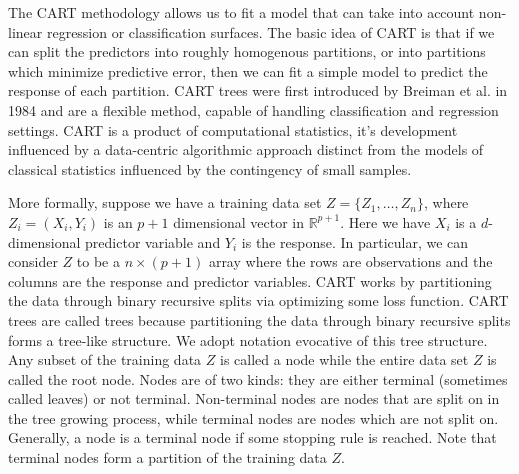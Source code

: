 \documentclass[12pt,twoside]{reedthesis}
\theoremstyle{definition}
\theoremstyle{definition}
\theoremstyle{definition}
\theoremstyle{remark}
\begin{document}
The CART methodology allows us to fit a model that can take into account
non-linear regression or classification surfaces. The basic idea of CART
is that if we can split the predictors into roughly homogenous
partitions, or into partitions which minimize predictive error, then we
can fit a simple model to predict the response of each partition. CART
trees were first introduced by Breiman et al. in 1984 and are a flexible
method, capable of handling classification and regression settings. CART
is a product of computational statistics, it's development influenced by
a data-centric algorithmic approach distinct from the models of
classical statistics influenced by the contingency of small samples.

More formally, suppose we have a training data set
\(Z=\{Z_1,\ldots,Z_n\}\), where \(Z_i=(X_i,Y_i)\) is an \(p+1\)
dimensional vector in \(\mathbb{R}^{p+1}\). Here we have \(X_i\) is a
\(d\)-dimensional predictor variable and \(Y_i\) is the response. In
particular, we can consider \(Z\) to be a \(n\times (p+1)\) array where
the rows are observations and the columns are the response and predictor
variables. CART works by partitioning the data through binary recursive
splits via optimizing some loss function. CART trees are called trees
because partitioning the data through binary recursive splits forms a
tree-like structure. We adopt notation evocative of this tree structure.
Any subset of the training data \(Z\) is called a node while the entire
data set \(Z\) is called the root node. Nodes are of two kinds: they are
either terminal (sometimes called leaves) or not terminal. Non-terminal
nodes are nodes that are split on in the tree growing process, while
terminal nodes are nodes which are not split on. Generally, a node is a
terminal node if some stopping rule is reached. Note that terminal nodes
form a partition of the training data \(Z\).
\end{document}
